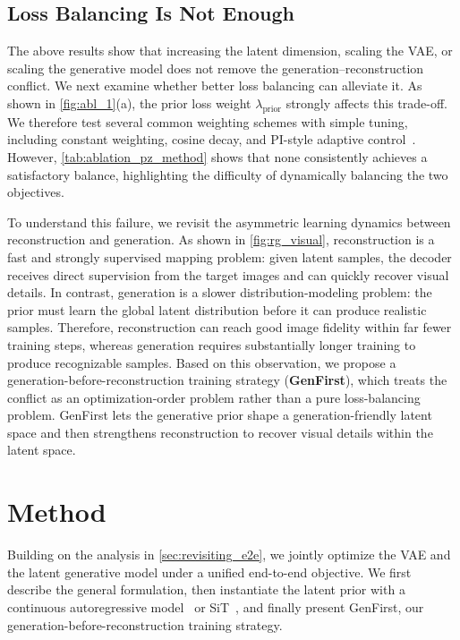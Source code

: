 \documentclass[]{bytedance_seed}
\begin{document}
\subsection{Loss Balancing Is Not Enough}
\label{subsec:loss_balancing}


The above results show that increasing the latent dimension, scaling the VAE, or scaling the generative model does not remove the generation--reconstruction conflict. 
We next examine whether better loss balancing can alleviate it. As shown in \cref{fig:abl_1}(a), the prior loss weight $\lambda_{\mathrm{prior}}$ strongly affects this trade-off. 
We therefore test several common weighting schemes with simple tuning, including constant weighting, cosine decay, and PI-style adaptive control~\cite{shao2020controlvae}. 
However, \cref{tab:ablation_pz_method} shows that none consistently achieves a satisfactory balance, highlighting the difficulty of dynamically balancing the two objectives.

To understand this failure, we revisit the asymmetric learning dynamics between reconstruction and generation.
As shown in \cref{fig:rg_visual}, reconstruction is a fast and strongly supervised mapping problem: given latent samples, the decoder receives direct supervision from the target images and can quickly recover visual details. 
In contrast, generation is a slower distribution-modeling problem: the prior must learn the global latent distribution before it can produce realistic samples. 
Therefore, reconstruction can reach good image fidelity within far fewer training steps, whereas generation requires substantially longer training to produce recognizable samples.
Based on this observation, we propose a generation-before-reconstruction training strategy (\textbf{GenFirst}), which treats the conflict as an optimization-order problem rather than a pure loss-balancing problem.
GenFirst lets the generative prior shape a generation-friendly latent space and then strengthens reconstruction to recover visual details within the latent space.

\section{Method}
\label{sec:method}
Building on the analysis in \cref{sec:revisiting_e2e}, we jointly optimize the VAE and the latent generative model under a unified end-to-end objective. 
We first describe the general formulation, then instantiate the latent prior with a continuous autoregressive model~\cite{zheng2025farmer} or SiT~\cite{sit}, and finally present GenFirst, our generation-before-reconstruction training strategy.
\end{document}
